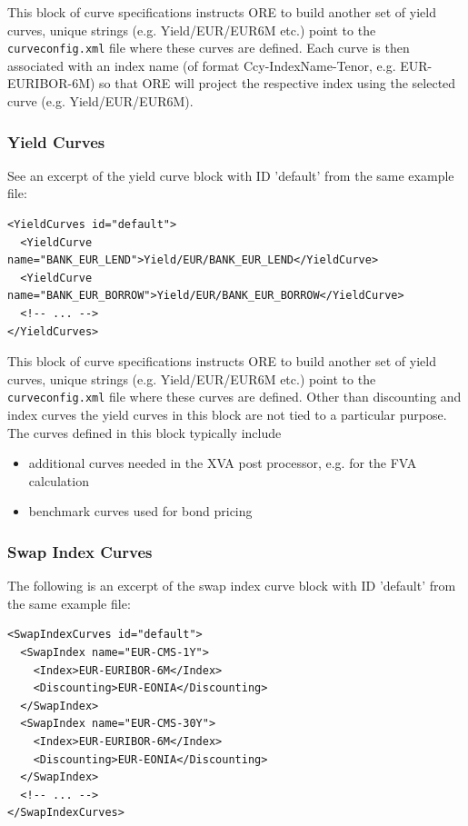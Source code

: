 This block of curve specifications instructs ORE to build another set of yield curves, unique strings
(e.g. Yield/EUR/EUR6M etc.) point to the {\tt curveconfig.xml} file where these curves are defined. Each curve is then
associated with an index name (of format Ccy-IndexName-Tenor, e.g. EUR-EURIBOR-6M) so that ORE will project the
respective index using the selected curve (e.g. Yield/EUR/EUR6M).

\subsubsection{Yield Curves}

See an excerpt of the yield curve block with ID 'default' from the same example file:

\begin{listing}[H]
\begin{verbatim}
<YieldCurves id="default">
  <YieldCurve name="BANK_EUR_LEND">Yield/EUR/BANK_EUR_LEND</YieldCurve>
  <YieldCurve name="BANK_EUR_BORROW">Yield/EUR/BANK_EUR_BORROW</YieldCurve>
  <!-- ... -->
</YieldCurves>
\end{verbatim}
\caption{Yield curve block with ID 'default'}
\label{lst:yieldcurve_spec}
\end{listing}

This block of curve specifications instructs ORE to build another set of yield curves, unique strings
(e.g. Yield/EUR/EUR6M etc.) point to the {\tt curveconfig.xml} file where these curves are defined. Other than
discounting and index curves the yield curves in this block are not tied to a particular purpose. The curves defined in
this block typically include

\begin{itemize}
\item additional curves needed in the XVA post processor, e.g. for the FVA calculation
\item benchmark curves used for bond pricing
\end{itemize}

\subsubsection{Swap Index Curves}

The following is an excerpt of the swap index curve block with ID 'default' from the same example file:

\begin{listing}[H]
\begin{verbatim}
<SwapIndexCurves id="default">
  <SwapIndex name="EUR-CMS-1Y">
    <Index>EUR-EURIBOR-6M</Index>
    <Discounting>EUR-EONIA</Discounting>
  </SwapIndex>
  <SwapIndex name="EUR-CMS-30Y">
    <Index>EUR-EURIBOR-6M</Index>
    <Discounting>EUR-EONIA</Discounting>
  </SwapIndex>
  <!-- ... -->
</SwapIndexCurves>
\end{verbatim}
\caption{Swap index curve block with ID 'default'}
\label{lst:swapindexcurve_spec}
\end{listing}

